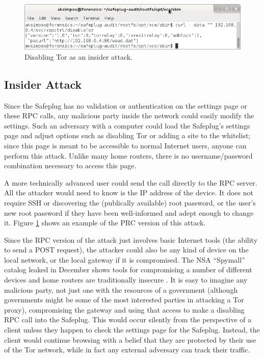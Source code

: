 \documentclass[conference]{IEEEtran}
\begin{document}
\begin{figure}
  \centering
  \includegraphics[width=.75\textwidth]{disabletor}
  \caption{Disabling Tor as an insider attack.}
  \label{disable}
\end{figure}

\subsection{Insider Attack}
Since the Safeplug has no validation or authentication on the settings page or these RPC calls, any malicious party inside the network could easily modify the settings.  Such an adversary with a computer could load the Safeplug's settings page and adjust options such as disabling Tor or adding a site to the whitelist; since this page is meant to be accessible to normal Internet users, anyone can perform this attack.  Unlike many home routers, there is no username/password combination necessary to access this page.  

A more technically advanced user could send the call directly to the RPC server.  All the attacker would need to know is the IP address of the device.  It does not require SSH or discovering the (publically available) root password, or the user's new root password if they have been well-informed and adept enough to change it.  Figure \ref{disable} shows an example of the PRC version of this attack.

Since the RPC version of the attack just involves basic Internet tools (the ability to send a POST request), the attacker could also be any kind of device on the local network, or the local gateway if it is compromised.  The NSA ``Spymall'' catalog leaked in December shows tools for compromising a number of different devices and home routers are traditionally insecure \cite{spymall}.  It is easy to imagine any malicious party, not just one with the resources of a government (although governments might be some of the most interested parties in attacking a Tor proxy), compromising the gateway and using that access to make a disabling RPC call into the Safeplug.  This would occur silently from the perspective of a client unless they happen to check the settings page for the Safeplug.  Instead, the client would continue browsing with a belief that they are protected by their use of the Tor network, while in fact any external adversary can track their traffic.
\end{document}
